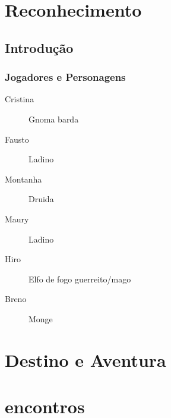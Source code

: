 \chapter{Reconhecimento}
\section{Introdu\c{c}\~ao}

\subsection{Jogadores e Personagens}
\begin{description}
\item[Cristina] Gnoma barda
\item[Fausto] Ladino
\item[Montanha] Druida
\item[Maury] Ladino
\item[Hiro] Elfo de fogo guerreito/mago
\item[Breno] Monge
\end{description}



\chapter{Destino e Aventura}


\chapter{encontros}

